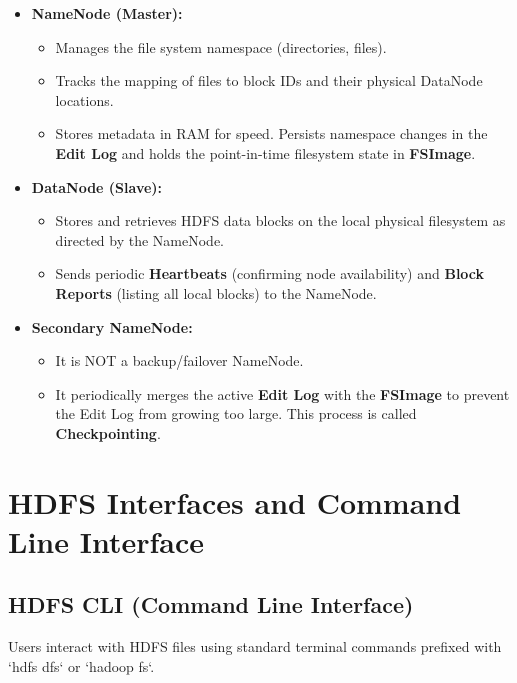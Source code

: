 \documentclass[12pt,a4paper]{article}
\begin{document}
\begin{itemize}[leftmargin=*, itemsep=4pt]
  \item \textbf{NameNode (Master):}
    \begin{itemize}[noitemsep]
      \item Manages the file system namespace (directories, files).
      \item Tracks the mapping of files to block IDs and their physical DataNode locations.
      \item Stores metadata in RAM for speed. Persists namespace changes in the \textbf{Edit Log} and holds the point-in-time filesystem state in \textbf{FSImage}.
    \end{itemize}
  \item \textbf{DataNode (Slave):}
    \begin{itemize}[noitemsep]
      \item Stores and retrieves HDFS data blocks on the local physical filesystem as directed by the NameNode.
      \item Sends periodic \textbf{Heartbeats} (confirming node availability) and \textbf{Block Reports} (listing all local blocks) to the NameNode.
    \end{itemize}
  \item \textbf{Secondary NameNode:}
    \begin{itemize}[noitemsep]
      \item It is NOT a backup/failover NameNode.
      \item It periodically merges the active \textbf{Edit Log} with the \textbf{FSImage} to prevent the Edit Log from growing too large. This process is called \textbf{Checkpointing}.
    \end{itemize}
\end{itemize}

\section{HDFS Interfaces and Command Line Interface}

\subsection{HDFS CLI (Command Line Interface)}
Users interact with HDFS files using standard terminal commands prefixed with `hdfs dfs` or `hadoop fs`.
\end{document}
